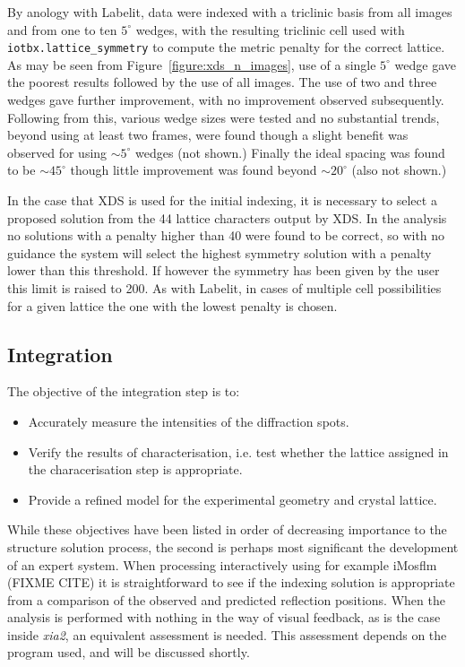 \documentclass[preprint,pdf]{iucr}
\begin{document}
By anology with Labelit, data were indexed with a triclinic basis
from all images and from one to ten $5^{\circ}$ wedges, with the
resulting triclinic cell used with \verb|iotbx.lattice_symmetry| to
compute the metric penalty for the correct lattice. As may be seen
from Figure~\ref{figure:xds_n_images},
use of a single $5^{\circ}$ wedge gave the poorest
results followed by the use of all images. The use of two and three
wedges gave further improvement, with no improvement observed
subsequently. Following from this, various wedge sizes were tested and
no substantial trends, beyond using at least two frames, were found
though a slight benefit was observed for using $\sim 5^{\circ}$ wedges
(not shown.) Finally the ideal spacing was found to be $\sim
45^{\circ}$ though little improvement was found beyond $\sim
20^{\circ}$ (also not shown.)  

In the case that XDS is used for the initial indexing, it is necessary
to select a proposed solution from the 44 lattice characters output by
XDS. In the analysis no solutions with a penalty higher than 40 were
found to be correct, so with no guidance the system will select the
highest symmetry solution with a penalty lower than this threshold. If
however the symmetry has been given by the user this limit is raised
to 200. As with Labelit, in cases of multiple cell possibilities for a
given lattice the one with the lowest penalty is chosen.


\subsection{Integration}

The objective of the integration step is to:

\begin{itemize}
\item{Accurately measure the intensities of the diffraction spots.}
\item{Verify the results of characterisation, i.e. test whether the
    lattice assigned in the characerisation step is appropriate.}
\item{Provide a refined model for the experimental geometry and
    crystal lattice.}
\end{itemize}

\noindent
While these objectives have been listed in order of decreasing
importance to the structure solution process, the second is perhaps
most significant the development of an expert system. When processing
interactively using for example iMosflm (FIXME CITE) it is
straightforward to see if the indexing solution is appropriate from a
comparison of the observed and predicted reflection positions. When
the analysis is performed with nothing in the way of visual feedback,
as is the case inside \emph{xia2}, an equivalent assessment is
needed. This assessment depends on the program used, and will be
discussed shortly.
\end{document}

